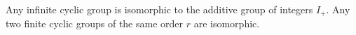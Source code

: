 Any infinite cyclic group is isomorphic to the additive group of integers $I_+$. Any two finite cyclic groups of the same order $r$ are isomorphic.
